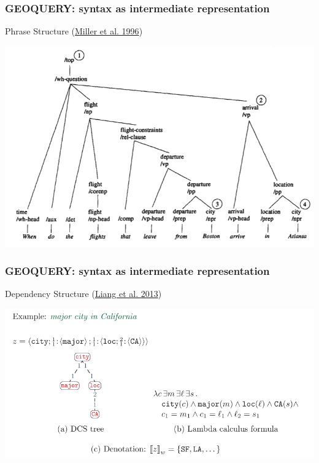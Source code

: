 \documentclass[ignorenonframetext]{beamer}
\begin{document}
\begin{frame}\frametitle{GEOQUERY: syntax as intermediate representation}
Phrase Structure
(\href{http://acl.ldc.upenn.edu/P/P96/P96-1008.pdf}{Miller et al. 1996})
\begin{center}
\href{http://acl.ldc.upenn.edu/P/P96/P96-1008.pdf}{
\includegraphics[width=\textwidth]{images/miller-ps.png}}
\end{center}
\end{frame}

\begin{frame}\frametitle{GEOQUERY: syntax as intermediate representation}
Dependency Structure
(\href{http://aclweb.org/anthology/J/J13/J13-2005.pdf}{Liang et al. 2013})
\begin{center}
\href{http://aclweb.org/anthology/J/J13/J13-2005.pdf}{
\includegraphics[width=\textwidth]{images/liang-dep.png}}
\end{center}
\end{frame}
\end{document}
